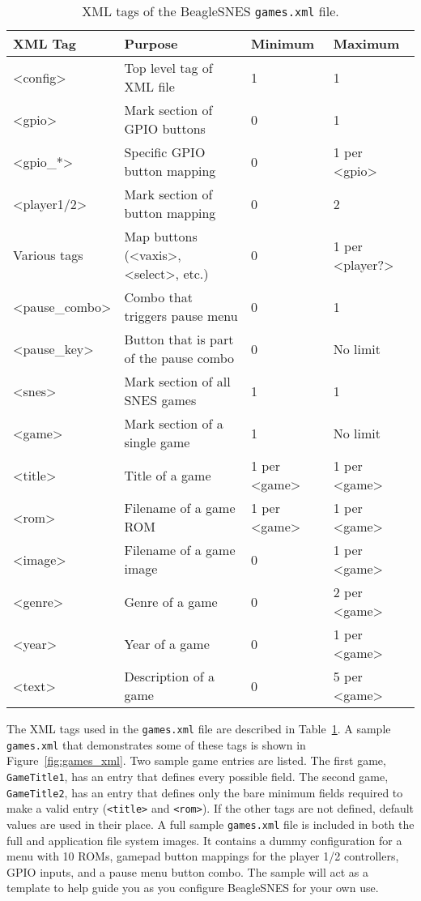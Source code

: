 \begin{table}[h]
\centering
\begin{tabular}{| l | l | l | l |} \hline
\textbf{XML Tag} & \textbf{Purpose} & \textbf{Minimum} & \textbf{Maximum}\\ \hline
<config> & Top level tag of XML file & 1 & 1 \\ \hline
<gpio> & Mark section of GPIO buttons & 0 & 1 \\ \hline
<gpio\_*> & Specific GPIO button mapping & 0 & 1 per <gpio> \\ \hline
<player1/2> & Mark section of button mapping & 0 & 2 \\ \hline
Various tags & Map buttons (<vaxis>, <select>, etc.) & 0 & 1 per <player?> \\ \hline
<pause\_combo> & Combo that triggers pause menu & 0 & 1 \\ \hline
<pause\_key> & Button that is part of the pause combo & 0 & No limit \\ \hline 
<snes> & Mark section of all SNES games & 1 & 1 \\ \hline
<game> & Mark section of a single game & 1 & No limit \\ \hline
<title> & Title of a game & 1 per <game> & 1 per <game> \\ \hline
<rom> & Filename of a game ROM & 1 per <game> & 1 per <game> \\ \hline
<image> & Filename of a game image & 0 & 1 per <game> \\ \hline
<genre> & Genre of a game & 0 & 2 per <game> \\ \hline
<year> & Year of a game & 0 & 1 per <game> \\ \hline
<text> & Description of a game & 0 & 5 per <game> \\ \hline
\end{tabular}
\vspace{-0.1in}
\caption{XML tags of the BeagleSNES \texttt{games.xml} file.}\label{tbl:games_xml}
\end{table}

The XML tags used in the \texttt{games.xml} file are described in Table~\ref{tbl:games_xml}. A sample \texttt{games.xml} that demonstrates some of these tags is shown in Figure~\ref{fig:games_xml}.  Two sample game entries are listed.  The first game, \texttt{GameTitle1}, has an entry that defines every possible field.  The second game, \texttt{GameTitle2}, has an entry that defines only the bare minimum fields required to make a valid entry (\texttt{<title>} and \texttt{<rom>}).  If the other tags are not defined, default values are used in their place. A full sample \texttt{games.xml} file is included in both the full and application file system images. It contains a dummy configuration for a menu with 10 ROMs, gamepad button mappings for the player 1/2 controllers, GPIO inputs, and a pause menu button combo.  The sample will act as a template to help guide you as you configure BeagleSNES for your own use.

